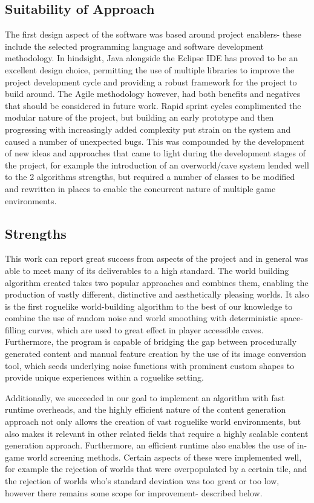 \documentclass[12pt,a4paper]{article}
\begin{document}
\subsection{Suitability of Approach}

The first design aspect of the software was based around project enablers- these include the selected programming language and software development methodology. In hindsight, Java alongside the Eclipse IDE has proved to be an excellent design choice, permitting the use of multiple libraries to improve the project development cycle and providing a robust framework for the project to build around. The Agile methodology however, had both benefits and negatives that should be considered in future work. Rapid sprint cycles complimented the modular nature of the project, but building an early prototype and then progressing with increasingly added complexity put strain on the system and caused a number of unexpected bugs. This was compounded by the development of new ideas and approaches that came to light during the development stages of the project, for example the introduction of an overworld/cave system lended well to the 2 algorithms strengths, but required a number of classes to be modified and rewritten in places to enable the concurrent nature of multiple game environments. 

\subsection{Strengths} 

This work can report great success from aspects of the project and in general was able to meet many of its deliverables to a high standard. The world building algorithm created takes two popular approaches and combines them, enabling the production of vastly different, distinctive and aesthetically pleasing worlds. It also is the first roguelike world-building algorithm to the best of our knowledge to combine the use of random noise and world smoothing with deterministic space-filling curves, which are used to great effect in player accessible caves. Furthermore, the program is capable of bridging the gap between procedurally generated content and manual feature creation by the use of its image conversion tool, which seeds underlying noise functions with prominent custom shapes to provide unique experiences within a roguelike setting. 

Additionally, we succeeded in our goal to implement an algorithm with fast runtime overheads, and the highly efficient nature of the content generation approach not only allows the creation of vast roguelike world environments, but also makes it relevant in other related fields that require a highly scalable content generation approach. Furthermore, an efficient runtime also enables the use of in-game world screening methods. Certain aspects of these were implemented well, for example the rejection of worlds that were overpopulated by a certain tile, and the rejection of worlds who's standard deviation was too great or too low, however there remains some scope for improvement- described below. 
\end{document}
